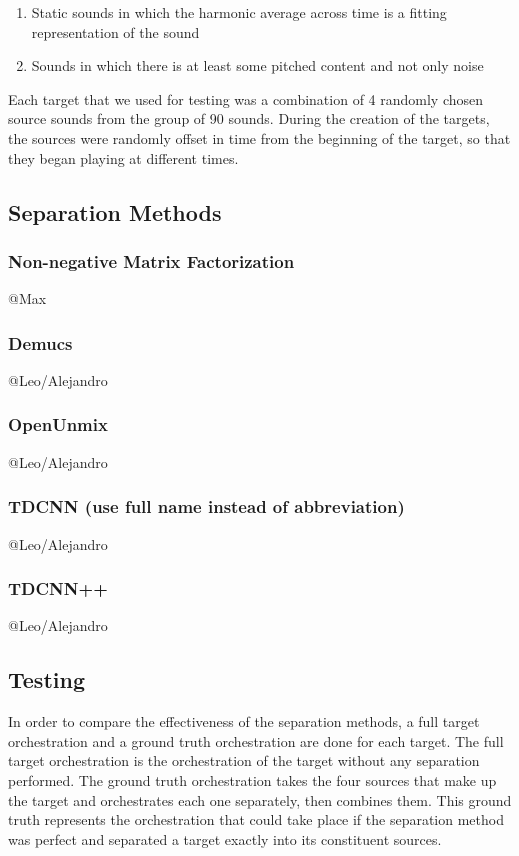 \documentclass{article}
\begin{document}
		\begin{enumerate}
			\item Static sounds in which the harmonic average across time is a fitting representation of the sound
			\item Sounds in which there is at least some pitched content and not only noise
		\end{enumerate}			
		Each target that we used for testing was a combination of 4 randomly chosen source sounds from the group of 90 sounds. During the creation of the targets, the sources were randomly offset in time from the beginning of the target, so that they began playing at different times.
		
		\subsection{Separation Methods}
	
			\subsubsection{Non-negative Matrix Factorization}
			@Max 
			
			\subsubsection{Demucs}
			@Leo/Alejandro
			
			\subsubsection{OpenUnmix}
			@Leo/Alejandro
			
			\subsubsection{TDCNN (use full name instead of abbreviation)}
			@Leo/Alejandro
			
			\subsubsection{TDCNN++}
			@Leo/Alejandro
	
		\subsection{Testing}
		In order to compare the effectiveness of the separation methods, a full target orchestration and a ground truth orchestration are done for each target. The full target orchestration is the orchestration of the target without any separation performed. The ground truth orchestration takes the four sources that make up the target and orchestrates each one separately, then combines them. This ground truth represents the orchestration that could take place if the separation method was perfect and separated a target exactly into its constituent sources. 
		
\end{document}
